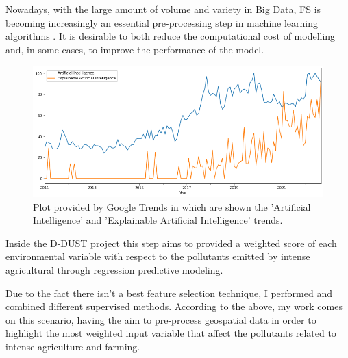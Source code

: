 Nowadays, with the large amount of volume and variety in Big Data, FS is becoming increasingly an essential pre-processing step in machine learning algorithms \cite{kamolov2021feature}.
It is desirable to both reduce the computational cost of modelling and, in some cases, to improve the performance of the model.\newline
\begin{figure}[H]
    \centering
    \includegraphics[scale=0.35]{images/AI_XAI.png}
    \caption{Plot provided by Google Trends in which are shown the 'Artificial Intelligence' and 'Explainable Artificial Intelligence' trends.}
    \label{fig:AI_XAI}
\end{figure}
Inside the D-DUST project this step aims to provided a weighted score of each environmental variable with respect to the pollutants emitted by intense agricultural through regression predictive modeling.\newline
\par
Due to the fact there isn’t a best feature selection technique, I performed and combined different supervised methods. 
\bigbreak
According to the above, my work comes on this scenario, having the aim to pre-process geospatial data in order to highlight the most weighted input variable that affect the pollutants related to intense agriculture and farming.\newline




